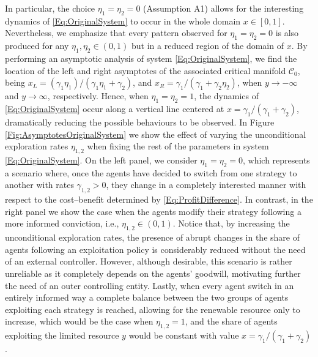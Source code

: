 \documentclass[3p]{elsarticle}
\theoremstyle{plain}
\theoremstyle{remark}
\theoremstyle{definition}
\begin{document}
    In particular, the choice $\eta_{1}=\eta_{2}=0$ (Assumption A1) allows for the interesting dynamics of \eqref{Eq:OriginalSystem} to occur in the whole domain $x\in[0,1]$. Nevertheless, we emphasize that every pattern observed for $\eta_{1} = \eta_{2} = 0$ is also produced for any $\eta_{1}, \eta_{2} \in (0,1)$ but in a reduced region of the domain of $x$. By performing an asymptotic analysis of system \eqref{Eq:OriginalSystem}, we find the location of the left and right asymptotes of the associated critical manifold $\mathcal{C}_{0}$, being $x_{L} = (\gamma_1 \eta_1)/(\gamma_{1}\eta_{1} + \gamma_2)$, and $x_{R} = \gamma_1/(\gamma_{1}+\gamma_{2}\eta_{2})$, when $y\rightarrow -\infty$ and $y\rightarrow \infty$, respectively. Hence, when $\eta_{1} = \eta_{2} = 1$, the dynamics of \eqref{Eq:OriginalSystem} occur along a vertical line centered at $x = \gamma_{1}/(\gamma_{1} + \gamma_{2})$, dramatically reducing the possible behaviours to be observed. In Figure \ref{Fig:AsymptotesOriginalSystem} we show the effect of varying the unconditional exploration rates $\eta_{1,2}$ when fixing the rest of the parameters in system \eqref{Eq:OriginalSystem}. On the left panel, we consider $\eta_1 = \eta_2 = 0$, which represents a scenario where, once the agents have decided to switch from one strategy to another with rates $\gamma_{1,2}>0$, they change in a completely interested manner with respect to the cost--benefit determined by \eqref{Eq:ProfitDifference}. In contrast, in the right panel we show the case when the agents modify their strategy following a more informed conviction, i.e., $\eta_{1,2}\in(0,1)$. Notice that, by increasing the unconditional exploration rates, the presence of abrupt changes in the share of agents following an exploitation policy is considerably reduced without the need of an external controller. However, although desirable, this scenario is rather unreliable as it completely depends on the agents' goodwill, motivating further the need of an outer controlling entity. Lastly, when every agent switch in an entirely informed way a complete balance between the two groups of agents exploiting each strategy is reached, allowing for the renewable resource only to increase, which would be the case when $\eta_{1,2}=1$, and the share of agents exploiting the limited resource $y$ would be constant with value $x=\gamma_{1}/(\gamma_{1}+\gamma_{2})$.
\end{document}
